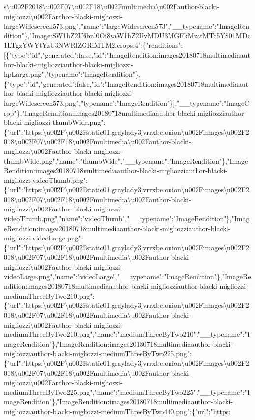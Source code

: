 s\textbackslash{}u002F2018\textbackslash{}u002F07\textbackslash{}u002F18\textbackslash{}u002Fmultimedia\textbackslash{}u002Fauthor-blacki-migliozzi\textbackslash{}u002Fauthor-blacki-migliozzi-largeWidescreen573.png","name":"largeWidescreen573","\_\_typename":"ImageRendition"\},"Image:SW1hZ2U6bnl0Oi8vaW1hZ2UvMDU3MGFkMzctMTc5YS01MDc1LTgzYWYtYzU3NWRlZGRiMTM2.crops.4":\{"renditions":{[}\{"type":"id","generated":false,"id":"ImageRendition:images20180718multimediaauthor-blacki-migliozziauthor-blacki-migliozzi-hpLarge.png","typename":"ImageRendition"\},\{"type":"id","generated":false,"id":"ImageRendition:images20180718multimediaauthor-blacki-migliozziauthor-blacki-migliozzi-largeWidescreen573.png","typename":"ImageRendition"\}{]},"\_\_typename":"ImageCrop"\},"ImageRendition:images20180718multimediaauthor-blacki-migliozziauthor-blacki-migliozzi-thumbWide.png":\{"url":"https:\textbackslash{}u002F\textbackslash{}u002Fstatic01.graylady3jvrrxbe.onion\textbackslash{}u002Fimages\textbackslash{}u002F2018\textbackslash{}u002F07\textbackslash{}u002F18\textbackslash{}u002Fmultimedia\textbackslash{}u002Fauthor-blacki-migliozzi\textbackslash{}u002Fauthor-blacki-migliozzi-thumbWide.png","name":"thumbWide","\_\_typename":"ImageRendition"\},"ImageRendition:images20180718multimediaauthor-blacki-migliozziauthor-blacki-migliozzi-videoThumb.png":\{"url":"https:\textbackslash{}u002F\textbackslash{}u002Fstatic01.graylady3jvrrxbe.onion\textbackslash{}u002Fimages\textbackslash{}u002F2018\textbackslash{}u002F07\textbackslash{}u002F18\textbackslash{}u002Fmultimedia\textbackslash{}u002Fauthor-blacki-migliozzi\textbackslash{}u002Fauthor-blacki-migliozzi-videoThumb.png","name":"videoThumb","\_\_typename":"ImageRendition"\},"ImageRendition:images20180718multimediaauthor-blacki-migliozziauthor-blacki-migliozzi-videoLarge.png":\{"url":"https:\textbackslash{}u002F\textbackslash{}u002Fstatic01.graylady3jvrrxbe.onion\textbackslash{}u002Fimages\textbackslash{}u002F2018\textbackslash{}u002F07\textbackslash{}u002F18\textbackslash{}u002Fmultimedia\textbackslash{}u002Fauthor-blacki-migliozzi\textbackslash{}u002Fauthor-blacki-migliozzi-videoLarge.png","name":"videoLarge","\_\_typename":"ImageRendition"\},"ImageRendition:images20180718multimediaauthor-blacki-migliozziauthor-blacki-migliozzi-mediumThreeByTwo210.png":\{"url":"https:\textbackslash{}u002F\textbackslash{}u002Fstatic01.graylady3jvrrxbe.onion\textbackslash{}u002Fimages\textbackslash{}u002F2018\textbackslash{}u002F07\textbackslash{}u002F18\textbackslash{}u002Fmultimedia\textbackslash{}u002Fauthor-blacki-migliozzi\textbackslash{}u002Fauthor-blacki-migliozzi-mediumThreeByTwo210.png","name":"mediumThreeByTwo210","\_\_typename":"ImageRendition"\},"ImageRendition:images20180718multimediaauthor-blacki-migliozziauthor-blacki-migliozzi-mediumThreeByTwo225.png":\{"url":"https:\textbackslash{}u002F\textbackslash{}u002Fstatic01.graylady3jvrrxbe.onion\textbackslash{}u002Fimages\textbackslash{}u002F2018\textbackslash{}u002F07\textbackslash{}u002F18\textbackslash{}u002Fmultimedia\textbackslash{}u002Fauthor-blacki-migliozzi\textbackslash{}u002Fauthor-blacki-migliozzi-mediumThreeByTwo225.png","name":"mediumThreeByTwo225","\_\_typename":"ImageRendition"\},"ImageRendition:images20180718multimediaauthor-blacki-migliozziauthor-blacki-migliozzi-mediumThreeByTwo440.png":\{"url":"https:\